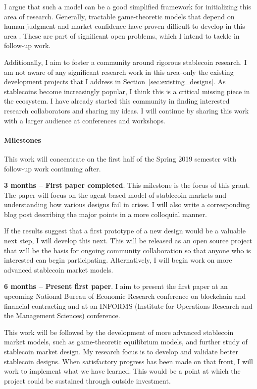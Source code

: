 \documentclass[10pt]{article}
\begin{document}
I argue that such a model can be a good simplified framework for initializing this area of research. Generally, tractable game-theoretic models that depend on human judgment and market confidence have proven difficult to develop in this area \citep{sok15}. These are part of significant open problems, which I intend to tackle in follow-up work.

Additionally, I aim to foster a community around rigorous stablecoin research. I am not aware of any significant research work in this area--only the existing development projects that I address in Section~\ref{sec:existing_designs}. As stablecoins become increasingly popular, I think this is a critical missing piece in the ecosystem. I have already started this community in finding interested research collaborators and sharing my ideas. I will continue by sharing this work with a larger audience at conferences and workshops.


\paragraph{Milestones} This work will concentrate on the first half of the Spring 2019 semester with follow-up work continuing after.

\textbf{3 months -- First paper completed}. This milestone is the focus of this grant. The paper will focus on the agent-based model of stablecoin markets and understanding how various designs fail in crises. I will also write a corresponding blog post describing the major points in a more colloquial manner.

If the results suggest that a first prototype of a new design would be a valuable next step, I will develop this next. This will be released as an open source project that will be the basis for ongoing community collaboration so that anyone who is interested can begin participating. Alternatively, I will begin work on more advanced stablecoin market models.

\textbf{6 months -- Present first paper}. I aim to present the first paper at an upcoming National Bureau of Economic Research conference on blockchain and financial contracting and at an INFORMS (Institute for Operations Research and the Management Sciences) conference.

This work will be followed by the development of more advanced stablecoin market models, such as game-theoretic equilibrium models, and further study of stablecoin market design. My research focus is to develop and validate better stablecoin designs. When satisfactory progress has been made on that front, I will work to implement what we have learned. This would be a point at which the project could be sustained through outside investment.
\end{document}
